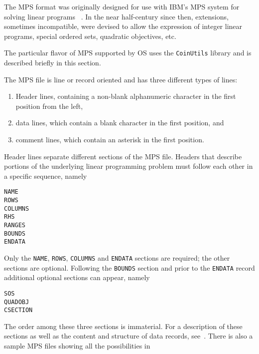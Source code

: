 

\label{section:MPS}

The MPS format was originally designed for use with IBM's MPS system for solving linear programs%
~\cite{Perrin-MPS}.
In the near half-century since then, extensions, sometimes incompatible, were devised to allow the expression of integer linear programs, special ordered sets, quadratic objectives, etc.

The particular flavor of MPS supported by OS uses the {\tt CoinUtils} library and is described briefly in this section. 

The MPS file is line or record oriented and has three different types of lines:
\begin{enumerate}
\item Header lines, containing a non-blank alphanumeric character in the first position from the left,
\item data lines, which contain a blank character in the first position, and
\item comment lines, which contain an asterisk in the first position.
\end{enumerate}

Header lines separate different sections of the MPS file. Headers that describe portions of the underlying linear programming problem must follow each other in a specific sequence, namely

\begin{verbatim}
NAME
ROWS
COLUMNS
RHS
RANGES
BOUNDS
ENDATA
\end{verbatim}

Only the {\tt NAME}, {\tt ROWS}, {\tt COLUMNS} and {\tt ENDATA} sections are required; the other sections are optional.
Following the {\tt BOUNDS} section and prior to the {\tt ENDATA} record additional optional 
sections can appear, namely

\begin{verbatim}
SOS
QUADOBJ
CSECTION
\end{verbatim}
  
The order among these three %
sections is immaterial. For a description of these sections as well as the content and structure of data records, see~\cite{MPS-MOSEK}. There is also a sample MPS files 
showing all the possibilities in {\tt }

\ifruncode\else    %

